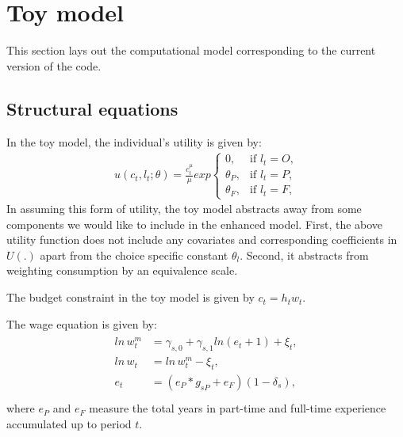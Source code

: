 \documentclass[letterpaper,10pt,english]{sphinxmanual}
\begin{document}
\section{Toy model}
\label{\detokenize{computational_model:toy-model}}
This section lays out the computational model corresponding to the current version of the code.


\subsection{Structural equations}
\label{\detokenize{computational_model:structural-equations}}
In the toy model, the individual’s utility is given by:
\begin{equation*}
\begin{split}u(c_t, l_t; \theta) = \frac{c_t^\mu}{\mu}exp
\begin{cases}
0, & \text{if $l_t = O$,}
\\[4pt]
\theta_P, & \text{if $l_t = P$},
\\[4pt]
\theta_F, & \text{if $l_t = F$},
\end{cases}\end{split}
\end{equation*}
In assuming this form of utility, the toy model abstracts away from some components we would like to include in the enhanced model. First, the above utility function does not include any covariates and corresponding coefficients in \(U(.)\) apart from the choice specific constant \(\theta_l\). Second, it abstracts from weighting consumption by an equivalence scale.

The budget constraint in the toy model is given by \(c_t = h_t w_t\).

The wage equation is given by:
\begin{equation*}
\begin{split}\begin{split}ln \hspace{2pt} w_t^m & = \gamma_{s,0}  + \gamma_{s,1} ln(e_t + 1) + \xi_t,\\
ln \hspace{2pt} w_t & = ln \hspace{2pt} w_t^m - \xi_t,\\
e_t & = (e_P*g_{sP} + e_F)(1-\delta_s),\\\end{split}\end{split}
\end{equation*}
where \(e_P\) and \(e_F\) measure the total years in part-time and full-time experience accumulated up to period \(t\).
\end{document}
